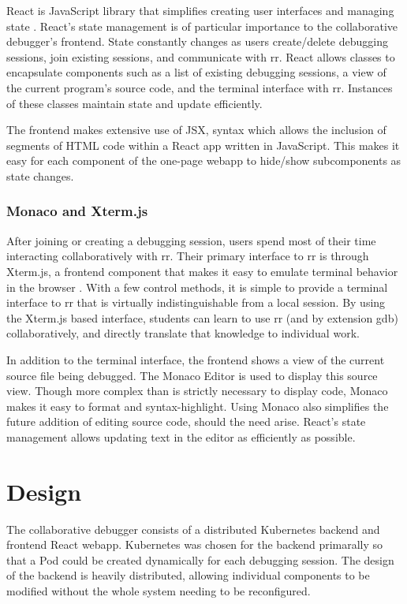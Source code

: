 \documentclass[12pt]{article}
\begin{document}
React is JavaScript library that simplifies creating user interfaces
and managing state \cite{react}.  React's state management is of
particular importance to the collaborative debugger's frontend.  State
constantly changes as users create/delete debugging sessions, join
existing sessions, and communicate with rr.  React allows classes to
encapsulate components such as a list of existing debugging sessions,
a view of the current program's source code, and the terminal
interface with rr.  Instances of these classes maintain state
and update efficiently.
\par
The frontend makes extensive use of JSX, syntax which allows the
inclusion of segments of HTML code within a React app written in
JavaScript.  This makes it easy for each component of the one-page
webapp to hide/show subcomponents as state changes.

\subsubsection{Monaco and Xterm.js}\label{xtermjs/monaco}

After joining or creating a debugging session, users spend most of
their time interacting collaboratively with rr.  Their primary
interface to rr is through Xterm.js, a frontend component that makes
it easy to emulate terminal behavior in the browser \cite{xtermjs}.
With a few control methods, it is simple to provide a terminal
interface to rr that is virtually indistinguishable from a local
session.  By using the Xterm.js based interface, students can learn to
use rr (and by extension gdb) collaboratively, and directly translate
that knowledge to individual work.
\par

In addition to the terminal interface, the frontend shows a view of
the current source file being debugged.  The Monaco Editor
\cite{monaco} is used to display this source view.  Though more
complex than is strictly necessary to display code, Monaco makes it
easy to format and syntax-highlight.  Using Monaco also simplifies the
future addition of editing source code, should the need arise.
React's state management allows updating text in the editor as
efficiently as possible.

\section{Design}

The collaborative debugger consists of a distributed Kubernetes
backend and frontend React webapp.  Kubernetes was chosen for the
backend primarally so that a Pod could be created dynamically for each
debugging session.  The design of the backend is heavily distributed,
allowing individual components to be modified without the whole system
needing to be reconfigured.
\end{document}
